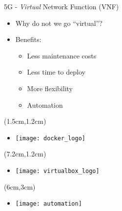 \begin{frame}{5G - \textit{Virtual} Network Function (VNF)}
  \begin{itemize}
    \item[]<1-> Why do not we go ``virtual''?
  \end{itemize}

  \begin{itemize}
  \item[]<2-> Benefits:
    \begin{itemize}
    \item<3-> Less maintenance costs
    \item<4-> Less time to deploy
    \item<5-> More flexibility
    \item<6-> Automation
    \end{itemize}
  \end{itemize}



  \begin{textblock*}{5cm}(1.5cm,1.2cm)
    \begin{itemize}
    \item[]<2-> \texttt{[image: docker\_logo]}
    \end{itemize}
  \end{textblock*}

  \begin{textblock*}{5cm}(7.2cm,1.2cm)
    \begin{itemize}
    \item[]<3-> \texttt{[image: virtualbox\_logo]}
    \end{itemize}
  \end{textblock*}

  \begin{textblock*}{5cm}(6cm,3cm)
    \begin{itemize}
    \item[]<6-> \texttt{[image: automation]}
    \end{itemize}
  \end{textblock*}
\end{frame}
